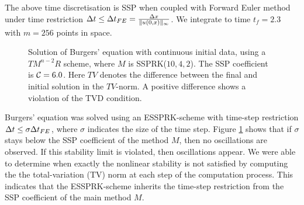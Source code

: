 The above time discretisation is SSP when coupled with Forward Euler method 
under time restriction $\Delta t \leq {\Delta t}_{FE} = \frac{\Delta x}{\|u(0,x)\|_{\infty}}$. 
We integrate to time $t_{f} = 2.3$ with $m = 256$ points in space.
\newline

\begin{figure}[t!]
    \centering
    \caption{Solution of Burgers' equation with continuous initial data, using a 
    $TM^{n-2}R$ scheme, where $ M $ is SSPRK($10,4,2$). 
    The SSP coefficient is $\mathcal{C} = 6.0$. 
    Here $TV$ denotes the difference between the final and initial solution in 
    the $TV$-norm. 
    A positive difference shows a violation of the TVD condition.}
    \label{fig:burgers_cont}
\end{figure}

Burgers' equation was solved using an ESSPRK-scheme with time-step 
restriction $\Delta t \leq \sigma{\Delta t}_{FE}$, where $\sigma$ indicates the size 
of the time step. 
Figure \ref{fig:burgers_cont} shows that if $\sigma$ stays below the SSP 
coefficient of the method $M$, then no oscillations are observed. 
If this stability limit is violated, then oscillations appear. 
We were able to determine when exactly the nonlinear stability is not 
satisfied by computing the the total-variation (TV) norm at each step of the 
computation process. 
This indicates that the ESSPRK-scheme inherits the time-step restriction 
from the SSP coefficient of the main method $M$.
\newline

